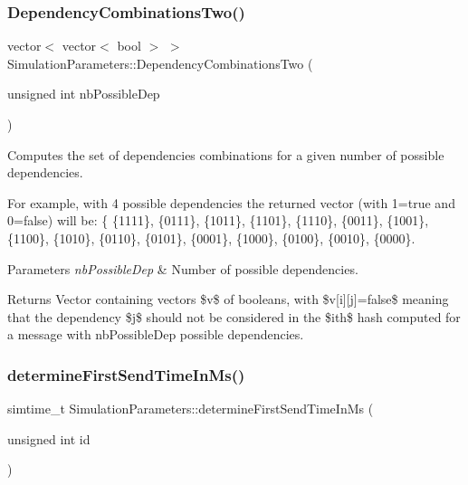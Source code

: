 \subsubsection{\texorpdfstring{Dependency\+Combinations\+Two()}{DependencyCombinationsTwo()}}
{\footnotesize\ttfamily vector$<$ vector$<$ bool $>$ $>$ Simulation\+Parameters\+::\+Dependency\+Combinations\+Two (\begin{DoxyParamCaption}\item[{unsigned int}]{nb\+Possible\+Dep }\end{DoxyParamCaption})\hspace{0.3cm}{\ttfamily [protected]}}



Computes the set of dependencies combinations for a given number of possible dependencies. 

For example, with 4 possible dependencies the returned vector (with 1=true and 0=false) will be\+: \{ \{1111\}, \{0111\}, \{1011\}, \{1101\}, \{1110\}, \{0011\}, \{1001\}, \{1100\}, \{1010\}, \{0110\}, \{0101\}, \{0001\}, \{1000\}, \{0100\}, \{0010\}, \{0000\}. 
\begin{DoxyParams}{Parameters}
{\em nb\+Possible\+Dep} & Number of possible dependencies. \\
\hline
\end{DoxyParams}
\begin{DoxyReturn}{Returns}
Vector containing vectors \$v\$ of booleans, with \$v\mbox{[}i\mbox{]}\mbox{[}j\mbox{]}=false\$ meaning that the dependency \$j\$ should not be considered in the \$ith\$ hash computed for a message with nb\+Possible\+Dep possible dependencies. 
\end{DoxyReturn}
\mbox{\label{class_simulation_parameters_acf83b84e172a799e1db3bf9554c4787f}} 
\subsubsection{\texorpdfstring{determine\+First\+Send\+Time\+In\+Ms()}{determineFirstSendTimeInMs()}}
{\footnotesize\ttfamily simtime\+\_\+t Simulation\+Parameters\+::determine\+First\+Send\+Time\+In\+Ms (\begin{DoxyParamCaption}\item[{unsigned int}]{id }\end{DoxyParamCaption})}



